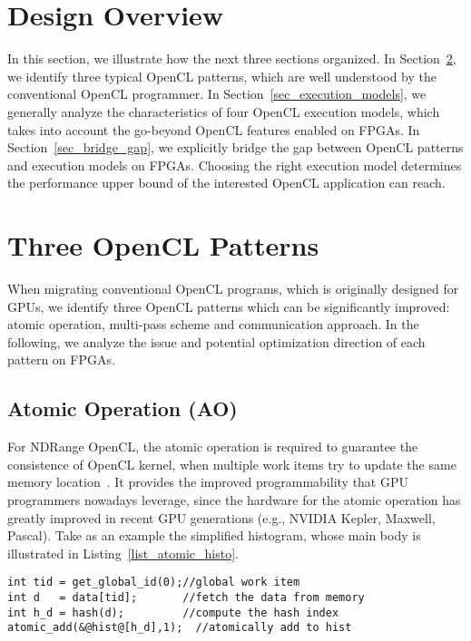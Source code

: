 \section{Design Overview}
In this section, we illustrate how the next three sections organized. 
In Section~\ref{sec_patterns}, we identify three typical OpenCL patterns, which are well understood by the conventional OpenCL programmer. %
In Section~\ref{sec_execution_models}, we generally analyze the characteristics of four OpenCL execution models, which takes into account the go-beyond OpenCL features enabled on FPGAs.
In Section~\ref{sec_bridge_gap}, we explicitly bridge the gap between OpenCL patterns and execution models on FPGAs. Choosing the right execution model determines the performance upper bound of the interested OpenCL application can reach. %
\vspace{-1ex}
\section{Three OpenCL Patterns}%
\label{sec_patterns}
When migrating conventional OpenCL programs, which is originally designed for GPUs, we identify three OpenCL patterns which can be significantly improved: atomic operation, multi-pass scheme and communication approach. In the following, we analyze the issue and potential optimization direction of each pattern on FPGAs.

\vspace{-1ex}
\subsection{Atomic Operation (AO)}
For NDRange OpenCL, the atomic operation is required to guarantee the consistence of OpenCL kernel, when multiple work items try to update the same memory location~\cite{opencl_spec, atomic_fpga16}. It provides the improved programmability that GPU programmers nowadays leverage, since the hardware for the atomic operation has greatly improved in recent GPU generations (e.g., NVIDIA Kepler, Maxwell, Pascal).
Take as an example the simplified histogram, whose main body is illustrated in Listing~\ref{list_atomic_histo}. %

\begin{lstlisting}[caption={Atomic-based histogram},label={list_atomic_histo},captionpos=b]
int tid = get_global_id(0);//global work item
int d   = data[tid];       //fetch the data from memory
int h_d = hash(d);         //compute the hash index
atomic_add(&@hist@[h_d],1);  //atomically add to hist
\end{lstlisting}

